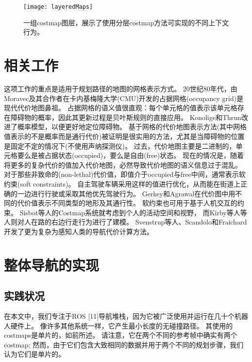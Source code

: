 \begin{figure}[!htb]
	\centering
	\texttt{[image: layeredMaps]}
	\caption{一组costmap图层，展示了使用分层costmap方法可实现的不同上下文行为。}
	\label{fig:costMap:layers}
\end{figure}

\section{相关工作}
这项工作的重点是适用于规划路径的地图的网格表示方式。 
20世纪80年代，由Moravec及其合作者在卡内基梅隆大学(CMU)开发的占据网格(occupancy grid)是现代代价地图鼻祖\cite{matthies1988integration,moravec1989sensor}。 
占据网格的语义值很直观：每个单元格的值表示该单元格存在障碍物的概率，因此其更新过程是贝叶斯规则的直接应用。 
Konolige\cite{konolige1997improved}和Thrun\cite{thrun2001learning}改进了概率模型，以便更好地定位障碍物。
基于网格的代价地图表示方法(其中网格值表示的不是概率而是通行代价)被证明是很实用的方法，尤其是当障碍物的位置是固定不定的情况下(不使用声纳探测仪)。
过去，代价地图主要是二进制的，单元格要么是被占据状态(occupied)，要么是自由(free)状态。
现在的情况是，随着将更多的复杂代价的值加入代价地图，必然导致代价地图的语义信息过于混乱。
对于那些非致命的(non-lethal)代价值，即值介于occupied与free中间，通常表示软约束(soft constraints)。
自主驾驶车辆采用这样的值进行优化，从而能在街道上正确的一边进行行驶或采取其他优先驾驶行为\cite{ferguson2008efficiently}。
Gerkey和Agrawal\cite{gerkey2008break}在代价图中用不同的代价值表示不同类型的地形及其通行性。
软约束也可用于基于人机交互的约束。 
Sisbot等人的Costmap系统\cite{sisbot2007human}就考虑到个人的活动空间和视野，
而Kirby等人\cite{kirby2009companion}等人则对人在路的右边行走行为进行了建模。
Svenstrup等人\cite{svenstrup2009pose}、Scandolo和Fraichard\cite{scandolo2011anthropomorphic}开发了更为复杂为感知人类的导航代价计算方法。


\section{整体导航的实现}


\subsection{实践状况}

在本文中，我们专注于ROS [11]导航堆栈，因为它被广泛使用并运行在几十个机器人硬件上。 像许多其他系统一样，它产生最小长度的无碰撞路径。 其使用的costmaps是单片的，如前所述。 请注意，它在两个不同的参考帧中确实有两个costmap; 然而，由于它们包含大致相同的数据并用于两个不同的规划步骤，我们认为它们是单片的。

